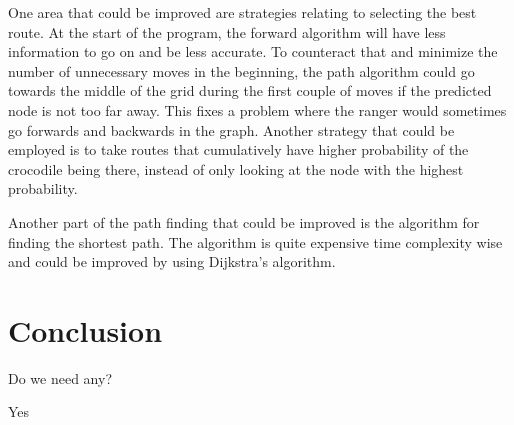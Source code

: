 \documentclass[12pt, a4paper]{article}
\begin{document}
One area that could be improved are strategies relating to selecting the best route. At the start of the program, the forward algorithm will have less information to go on and be less accurate. To counteract that and minimize the number of unnecessary moves in the beginning, the path algorithm could go towards the middle of the grid during the first couple of moves if the predicted node is not too far away. This fixes a problem where the ranger would sometimes go forwards and backwards in the graph. Another strategy that could be employed is to take routes that cumulatively have higher probability of the crocodile being there, instead of only looking at the node with the highest probability.

Another part of the path finding that could be improved is the algorithm for finding the shortest path. The algorithm is quite expensive time complexity wise and could be improved by using Dijkstra's algorithm.


\section{Conclusion}

Do we need any?

Yes
\end{document}
